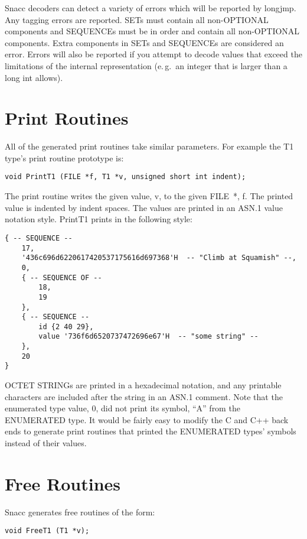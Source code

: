 Snacc decoders can detect a variety of errors which will be reported
by {\C longjmp}.  Any tagging errors are reported. SETs must contain
all non-OPTIONAL components and SEQUENCEs must be in order and contain
all non-OPTIONAL components. Extra components in SETs and SEQUENCEs
are considered an error.  Errors will also be reported if you attempt
to decode values that exceed the limitations of the internal
representation (e.\,g.\ an integer that is larger than a
{\C long int} allows).

\section{\label{print-gen-C-section}Print Routines}
All of the generated print routines take similar parameters. For
example the {\C T1} type's print routine prototype is:
\begin{verbatim}
void PrintT1 (FILE *f, T1 *v, unsigned short int indent);
\end{verbatim}

The print routine writes the given value, {\C v}, to the given {\C FILE~*},
{\C f}.  The printed value is indented by {\C indent} spaces.  The
values are printed in an ASN.1 value notation style.  {\C PrintT1}
prints in the following style:
\begin{small}
\begin{verbatim}
{ -- SEQUENCE --
    17,
    '436c696d6220617420537175616d697368'H  -- "Climb at Squamish" --,
    0,
    { -- SEQUENCE OF --
        18,
        19
    },
    { -- SEQUENCE --
        id {2 40 29},
        value '736f6d6520737472696e67'H  -- "some string" --
    },
    20
}
\end{verbatim}
\end{small}

OCTET STRINGs are printed in a hexadecimal notation, and any printable
characters are included after the string in an ASN.1 comment.  Note
that the enumerated type value, 0, did not print its symbol, ``A''
from the ENUMERATED type.  It would be fairly easy to modify the C and
C++ back ends to generate print routines that printed the ENUMERATED
types' symbols instead of their values.

\section{\label{free-gen-C-section}Free Routines}

Snacc generates free routines of the form:
\begin{verbatim}
void FreeT1 (T1 *v);
\end{verbatim}

